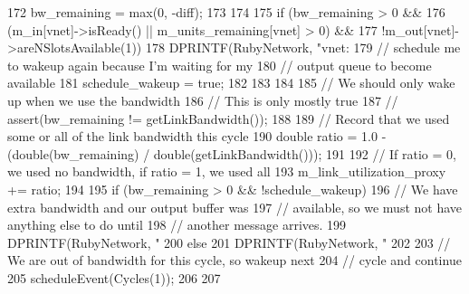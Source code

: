 \begin{DoxyCode}
{{{172             bw_remaining = max(0, -diff);
173         }
174 
175         if (bw_remaining > 0 &&
176             (m_in[vnet]->isReady() || m_units_remaining[vnet] > 0) &&
177             !m_out[vnet]->areNSlotsAvailable(1)) {
178             DPRINTF(RubyNetwork, "vnet: %
179             // schedule me to wakeup again because I'm waiting for my
180             // output queue to become available
181             schedule_wakeup = true;
182         }
183     }
184 
185     // We should only wake up when we use the bandwidth
186     // This is only mostly true
187     // assert(bw_remaining != getLinkBandwidth());
188 
189     // Record that we used some or all of the link bandwidth this cycle
190     double ratio = 1.0 - (double(bw_remaining) / double(getLinkBandwidth()));
191 
192     // If ratio = 0, we used no bandwidth, if ratio = 1, we used all
193     m_link_utilization_proxy += ratio;
194 
195     if (bw_remaining > 0 && !schedule_wakeup) {
196         // We have extra bandwidth and our output buffer was
197         // available, so we must not have anything else to do until
198         // another message arrives.
199         DPRINTF(RubyNetwork, "%
200     } else {
201         DPRINTF(RubyNetwork, "%
202 
203         // We are out of bandwidth for this cycle, so wakeup next
204         // cycle and continue
205         scheduleEvent(Cycles(1));
206     }
207 }
\end{DoxyCode}



